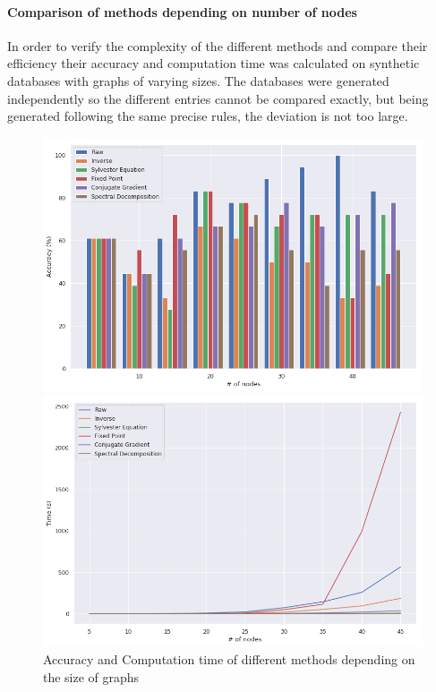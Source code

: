\documentclass{article}
\theoremstyle{definition}
\begin{document}
\paragraph{Comparison of methods depending on number of nodes}
In order to verify the complexity of the different methods and compare their efficiency their accuracy and computation time was calculated on synthetic databases with graphs of varying sizes. The databases were generated independently so the different entries cannot be compared exactly, but being generated following the same precise rules, the deviation is not too large.
\begin{figure}[!htb]
	\begin{multicols}{2}
		\includegraphics[width=\linewidth]{data/nb_nodes/acc.png}\par
		\includegraphics[width=\linewidth]{data/nb_nodes/time.png}\par
	\end{multicols}
\caption{Accuracy and Computation time of different methods depending on the size of graphs}
\end{figure}
\end{document}
